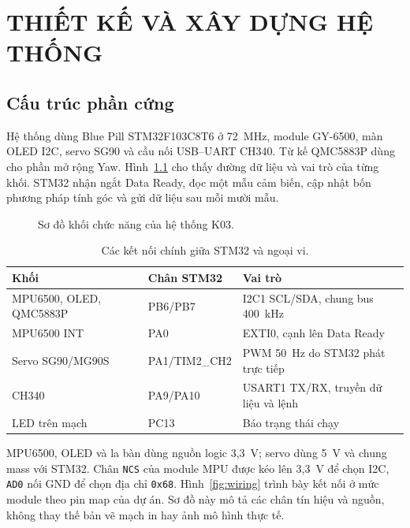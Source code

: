 \documentclass[14pt,a4paper,oneside]{extreport}
\begin{document}


\chapter{THIẾT KẾ VÀ XÂY DỰNG HỆ THỐNG}

\section{Cấu trúc phần cứng}
Hệ thống dùng Blue Pill STM32F103C8T6 ở 72~MHz, module GY-6500, màn OLED I2C, servo SG90 và cầu nối USB--UART CH340. Từ kế QMC5883P dùng cho phần mở rộng Yaw. Hình~\ref{fig:block} cho thấy đường dữ liệu và vai trò của từng khối. STM32 nhận ngắt Data Ready, đọc một mẫu cảm biến, cập nhật bốn phương pháp tính góc và gửi dữ liệu sau mỗi mười mẫu.

\begin{figure}[htbp]\centering
\resizebox{\textwidth}{!}{}
\caption{Sơ đồ khối chức năng của hệ thống K03.}\label{fig:block}
\end{figure}

\begin{table}[htbp]\centering\fontsize{12}{17}\selectfont
\caption{Các kết nối chính giữa STM32 và ngoại vi.}\label{tab:pinmap}
\begin{tabular}{|L{38mm}|C{33mm}|L{72mm}|}
\hline Khối & Chân STM32 & Vai trò\\ \hline
MPU6500, OLED, QMC5883P & PB6/PB7 & I2C1 SCL/SDA, chung bus 400~kHz\\ \hline
MPU6500 INT & PA0 & EXTI0, cạnh lên Data Ready\\ \hline
Servo SG90/MG90S & PA1/TIM2\_CH2 & PWM 50~Hz do STM32 phát trực tiếp\\ \hline
CH340 & PA9/PA10 & USART1 TX/RX, truyền dữ liệu và lệnh\\ \hline
LED trên mạch & PC13 & Báo trạng thái chạy\\ \hline
\hline
\end{tabular}
\end{table}

MPU6500, OLED và la bàn dùng nguồn logic 3,3~V; servo dùng 5~V và chung mass với STM32. Chân \texttt{NCS} của module MPU được kéo lên 3,3~V để chọn I2C, \texttt{AD0} nối GND để chọn địa chỉ \texttt{0x68}. Hình~\ref{fig:wiring} trình bày kết nối ở mức module theo pin map của dự án. Sơ đồ này mô tả các chân tín hiệu và nguồn, không thay thế bản vẽ mạch in hay ảnh mô hình thực tế.
\end{document}
